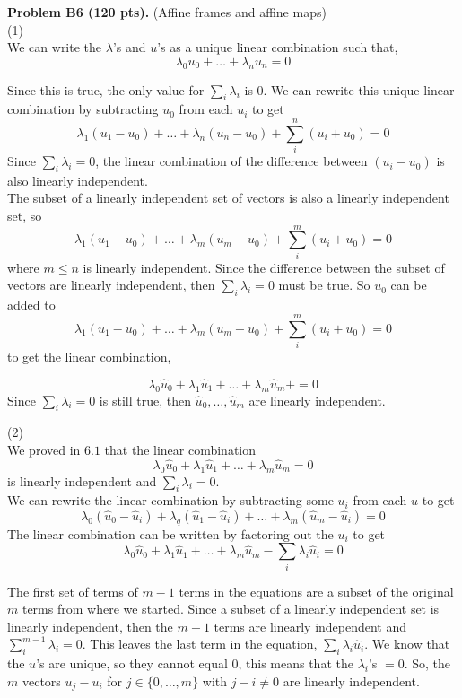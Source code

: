 \documentclass[12pt]{article}
\begin{document}
\vspace {0.25cm}\noindent
{\bf Problem B6 (120 pts).} (Affine frames and affine maps) \\
(1) \\

We can write the $\lambda$'s and $u$'s as a unique linear combination such that, 
$$ \lambda_0 u_0 + \ldots + \lambda_n u_n = 0 $$

Since this is true, the only value for $\sum_{i} \lambda_i$ is 0. We can rewrite this unique linear combination by subtracting $u_0$ from each $u_i$ to get $$\lambda_1 (u_1 - u_0) + \ldots + \lambda_n (u_n - u_0) + \sum_{i}^{n} (u_i + u_0) = 0$$ Since $\sum_{i} \lambda_i = 0$, the linear combination of the difference between $(u_i - u_0)$ is also linearly independent. \\

The subset of a linearly independent set of vectors is also a linearly independent set, so $$\lambda_1 (u_1 - u_0) + \ldots + \lambda_m (u_m - u_0) + \sum_{i}^{m} (u_i + u_0) = 0$$ where $m \leq n$ is linearly independent. Since the difference between the subset of vectors are linearly independent, then $\sum_{i} \lambda_i = 0$ must be true. So $u_0$ can be added to $$\lambda_1 (u_1 - u_0) + \ldots + \lambda_m (u_m - u_0) + \sum_{i}^{m} (u_i + u_0) = 0$$ to get the linear combination, 

$$\lambda_0 \hat{u}_0  + \lambda_1 \hat{u}_1  + \ldots + \lambda_m \hat{u}_m  + = 0$$ Since $\sum_{i} \lambda_i = 0$ is still true, then $\hat{u}_0, \ldots, \hat{u}_m$ are linearly independent.   


\medskip
(2) \\
We proved in $6.1$ that the linear combination $$\lambda_0 \hat{u}_0  + \lambda_1 \hat{u}_1  + \ldots + \lambda_m \hat{u}_m  = 0$$ is linearly independent and $\sum_{i} \lambda_i = 0$. \\

We can rewrite the linear combination by subtracting some $u_i$ from each $u$ to get $$\lambda_0 (\hat{u}_0 - \hat{u}_i)  + \lambda_q (\hat{u}_1 - \hat{u}_i)+ \ldots + \lambda_m (\hat{u}_m - \hat{u}_i) = 0$$ The linear combination can be written by factoring out the $u_i$ to get  $$\lambda_0 \hat{u}_0  + \lambda_1 \hat{u}_1 + \ldots + \lambda_m \hat{u}_m  -  \sum_{i} \lambda_i \hat{u}_i= 0$$

The first set of terms of $m-1$ terms in the equations are a subset of the original $m$ terms from where we started. Since a subset of a linearly independent set is linearly independent, then the $m-1$ terms are linearly independent and $\sum_{i}^{m-1} \lambda_i =0$. This leaves the last term in the equation, $\sum_{i} \lambda_i \hat{u}_i$. We know that the $u$'s are unique, so they cannot equal $0$, this means that the $\lambda_i$'s $=0$. So, the
$m$ vectors $u_j - u_i$  for $j \in \{0, \ldots, m\}$ with $j - i \not = 0$
are linearly independent. 
\end{document}
